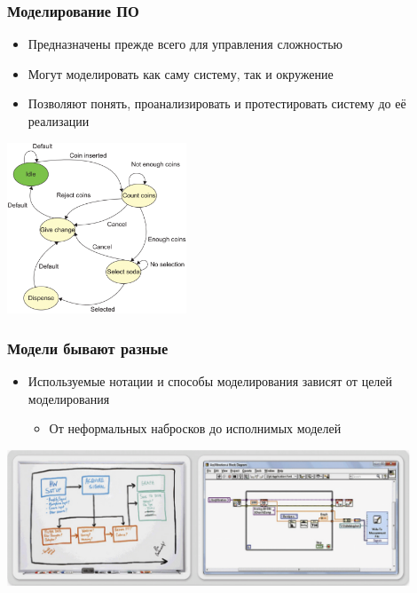 \documentclass{../../slides-style}
\begin{document}
    \begin{frame}
        \frametitle{Моделирование ПО}
        \begin{itemize}
            \item Предназначены прежде всего для управления сложностью
            \item Могут моделировать как саму систему, так и окружение
            \item Позволяют понять, проанализировать и протестировать систему до её реализации
        \end{itemize}
        \begin{center}
            \includegraphics[width=0.4\textwidth]{vendingMachine.png}
        \end{center}
    \end{frame}

    \begin{frame}
        \frametitle{Модели бывают разные}
        \begin{itemize}
            \item Используемые нотации и способы моделирования зависят от целей моделирования
            \begin{itemize}
                \item От неформальных набросков до исполнимых моделей
            \end{itemize}
        \end{itemize}
        \begin{center}
            \includegraphics[width=0.9\textwidth]{sketchesVsFormalNotations.png}
        \end{center}
    \end{frame}
\end{document}
